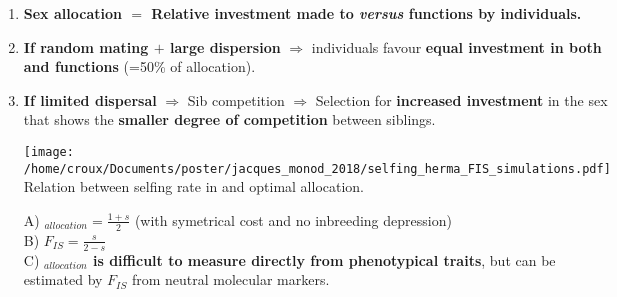 \documentclass[25pt, a0paper, portrait, margin=0mm, innermargin=15mm,
     blockverticalspace=15mm, colspace=15mm, subcolspace=8mm]{tikzposter}
\begin{document}
\begin{columns}
{
	\begin{enumerate}
		\item \textbf{Sex allocation $=$ Relative investment made to {\faMars} \textit{versus} {\faVenus} functions by {\LARGE\Hermaphrodite} individuals.}
		\item \textbf{If random mating $+$ large dispersion} $\Rightarrow$ {\LARGE\Hermaphrodite} individuals favour \textbf{equal investment in both {\faMars} and {\faVenus} functions} (=50\% of {\faVenus} allocation).
		\item \textbf{If limited dispersal} $\Rightarrow$ Sib competition $\Rightarrow$ Selection for \textbf{increased investment} in the sex that shows the \textbf{smaller degree of competition} between siblings.

		\begin{center}
		\texttt{[image: /home/croux/Documents/poster/jacques\_monod\_2018/selfing\_herma\_FIS\_simulations.pdf]}
		\\Relation between selfing rate in {\LARGE\Hermaphrodite} and optimal \faVenus allocation.
		\end{center}
		A) \faVenus$_{allocation} = \frac{1+s}{2}$ (with symetrical cost and no inbreeding depression)\\
		B) $F_{IS} = \frac{s}{2-s}$\\
		C) \textbf{\faVenus$_{allocation}$ is difficult to measure directly from phenotypical traits}, but can be estimated by $F_{IS}$ from neutral molecular markers.\\
	\end{enumerate}
}




\end{columns}
\end{document}
